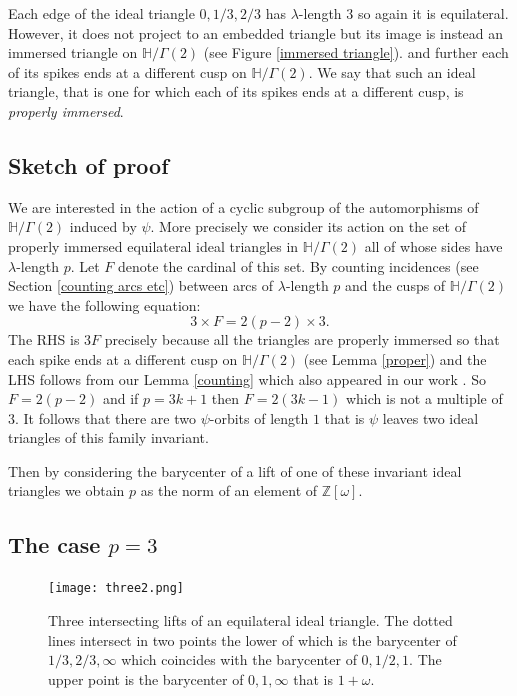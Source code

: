 \documentclass[12pt]{amsart}
\theoremstyle{plain}
\theoremstyle{definition}
\def\HH{\mathbb{H}}
\def\xx{\HH/g2}
\def\ZZ{\mathbb{Z}}
\def\g2{\Gamma(2)}
\def\xx{\HH/\g2}
\begin{document}
Each edge of the ideal triangle $0,1/3,2/3$
has $\lambda$-length $3$ 
so again it is equilateral.
However, it does not project to  an embedded triangle
but its image is instead an immersed triangle on $\xx$
(see Figure \ref{immersed triangle}).
and further each of its spikes ends at a different cusp on 
$\xx$.
We say that such an ideal triangle,
that is one for which 
each of its spikes ends at a different cusp,
is \textit{properly immersed}.


\subsection{Sketch of proof}

We are interested in the action of a cyclic subgroup of the 
automorphisms of $\xx$ induced by $\psi$.
More precisely we consider its action on the
set of properly immersed equilateral ideal triangles in $\xx$
all of whose sides have $\lambda$-length $p$.
Let $F$ denote the cardinal of this set.
By counting incidences  (see Section \ref{counting arcs etc}) between  
arcs of $\lambda$-length $p$
and the cusps of $\xx$
we  have the following equation:
\begin{equation} \label{incidence}
3 \times F = 2 (p-2) \times 3.
\end{equation}
The RHS is $3F$ precisely because all the  triangles
are properly immersed so that each spike ends at a
different cusp on $\xx$ (see Lemma \ref{proper})
and the LHS follows from our Lemma \ref{counting}
which also  appeared in our work \cite{vlad}.
So $F = 2(p-2)$ and  if $p= 3k + 1$ then $F = 2(3k -1)$
which is not a multiple of $3$.
It follows that there are two $\psi$-orbits of length $1$
that is $\psi$ leaves two ideal triangles of this family invariant.


Then  by considering the barycenter
of a lift of one of these invariant ideal triangles
we obtain $p$ as the norm of an element of $\ZZ[\omega]$.

\subsection{The case $p=3$}


\begin{figure}[ht]
\begin{center}
\texttt{[image: three2.png]} 
\end{center}
\caption{Three intersecting  lifts  of an equilateral ideal triangle.
The dotted lines intersect in two points the lower of which 
is the barycenter of $1/3, 2/3,\infty$
which coincides with the barycenter of $0, 1/2,1$.
The upper point is the barycenter of $0,1,\infty$
that is $1+\omega$.}
\end{figure}
\end{document}
